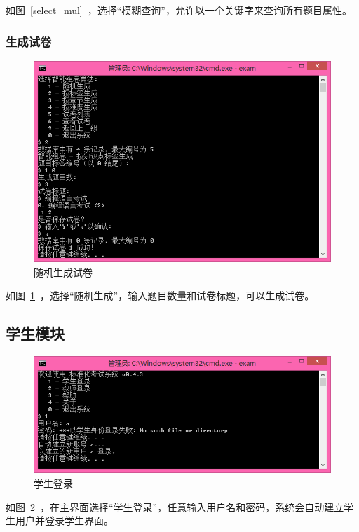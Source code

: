 如图~\ref{select_mul}~，选择“模糊查询”，允许以一个关键字来查询所有题目属性。

\subsubsection{生成试卷}

\begin{figure}[htp]
\includegraphics[width=\textwidth]{image/papar_random.png}
\caption{\label{papar_random}随机生成试卷}
\end{figure}

如图~\ref{papar_random}~，选择“随机生成”，输入题目数量和试卷标题，可以生成试卷。

\subsection{学生模块}

\begin{figure}[htp]
\includegraphics[width=\textwidth]{image/login_student.png}
\caption{\label{login_student}学生登录}
\end{figure}

如图~\ref{login_student}~，在主界面选择“学生登录”，任意输入用户名和密码，系统会自动建立学生用户并登录学生界面。


